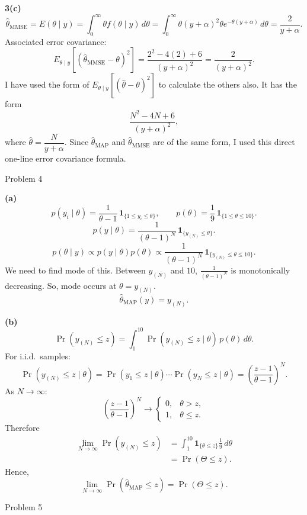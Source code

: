\documentclass[12pt,a4paper,onecolumn]{exam}
\newcommand{\questionheader}[1]{%
  \begin{tcolorbox}[
    enhanced,
    colback=black,
    coltext=white,
    boxrule=0pt,
    fontupper=\Large\bfseries,
    arc=4mm
  ]
  #1
  \end{tcolorbox}%
}
\begin{document}
\begin{solution}
\textbf{3(c)}
\[
\hat\theta_{\mathrm{MMSE}}=E(\theta\mid y)
=\int_0^\infty \theta f(\theta\mid y)\,d\theta
=\int_0^\infty \theta (y+\alpha)^2\theta e^{-\theta(y+\alpha)}\,d\theta
=\frac{2}{y+\alpha}.
\]
Associated error covariance:
\[
E_{\theta\mid y}\!\left[(\hat\theta_{\mathrm{MMSE}}-\theta)^2\right]
=\frac{2^2-4(2)+6}{(y+\alpha)^2}
=\frac{2}{(y+\alpha)^2}.
\]
I have used the form of $E_{\theta\mid y}\!\left[(\hat\theta-\theta)^2\right]$ to calculate the others also.
It has the form
\[
\frac{N^2-4N+6}{(y+\alpha)^2},
\]
where $\hat\theta=\dfrac{N}{y+\alpha}$. Since $\hat\theta_{\mathrm{MAP}}$ and
$\hat\theta_{\mathrm{MMSE}}$ are of the same form, I used this direct one-line error covariance formula.
\end{solution}

\questionheader{Problem 4 }

\begin{solution}
\textbf{(a)}
\[
p(y_i\mid \theta)=\frac{1}{\theta-1}\,\mathbf{1}_{\{1\le y_i\le \theta\}},
\qquad
p(\theta)=\frac{1}{9}\,\mathbf{1}_{\{1\le \theta\le 10\}}.
\]
\[
p(y\mid \theta)=\frac{1}{(\theta-1)^N}\,\mathbf{1}_{\{y_{(N)}\le \theta\}}.
\]
\[
p(\theta\mid y)\propto p(y\mid\theta)p(\theta)
\propto \frac{1}{(\theta-1)^N}\,\mathbf{1}_{\{y_{(N)}\le \theta\le 10\}}.
\]
We need to find mode of this.
Between $y_{(N)}$ and $10$, $\frac{1}{(\theta-1)^N}$ is monotonically decreasing.
So, mode occurs at $\theta=y_{(N)}$.
\[
\hat\theta_{\mathrm{MAP}}(y)=y_{(N)}.
\]

\textbf{(b)}
\[
\Pr(y_{(N)}\le z)=\int_1^{10}\Pr(y_{(N)}\le z\mid\theta)\,p(\theta)\,d\theta.
\]
For i.i.d.\ samples:
\[
\Pr(y_{(N)}\le z\mid\theta)=\Pr(y_1\le z\mid\theta)\cdots \Pr(y_N\le z\mid\theta)
=\left(\frac{z-1}{\theta-1}\right)^N.
\]
As $N\to\infty$:
\[
\left(\frac{z-1}{\theta-1}\right)^N\to
\begin{cases}
0,&\theta>z,\\
1,&\theta\le z.
\end{cases}
\]
Therefore
\begin{align*}
\lim_{N\to\infty}\Pr(y_{(N)}\le z)
&=\int_1^{10}\mathbf{1}_{\{\theta\le z\}}\frac{1}{9}\,d\theta\\
&=\Pr(\Theta\le z).
\end{align*}
Hence,
\[
\lim_{N\to\infty}\Pr(\hat\theta_{\mathrm{MAP}}\le z)=\Pr(\Theta\le z).
\]

\end{solution}

\questionheader{Problem 5}
\end{document}

